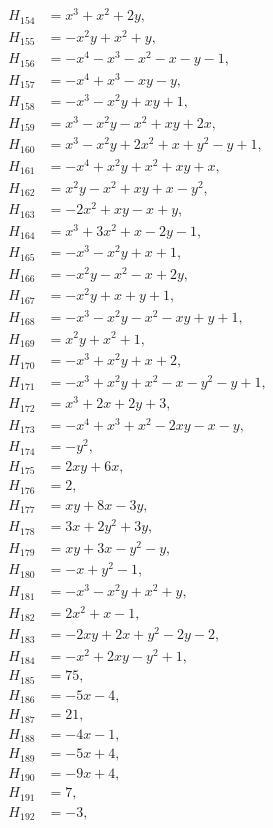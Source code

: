 \documentclass[11pt]{article}
\begin{document}
\begin{align*}
H_{154}&=x^{3}+x^{2}+2y,\\
H_{155}&=-x^{2}y+x^{2}+y,\\
H_{156}&=-x^{4}-x^{3}-x^{2}-x-y-1,\\
H_{157}&=-x^{4}+x^{3}-xy-y,\\
H_{158}&=-x^{3}-x^{2}y+xy+1,\\
H_{159}&=x^{3}-x^{2}y-x^{2}+xy+2x,\\
H_{160}&=x^{3}-x^{2}y+2x^{2}+x+y^{2}-y+1,\\
H_{161}&=-x^{4}+x^{2}y+x^{2}+xy+x,\\
H_{162}&=x^{2}y-x^{2}+xy+x-y^{2},\\
H_{163}&=-2x^{2}+xy-x+y,\\
H_{164}&=x^{3}+3x^{2}+x-2y-1,\\
H_{165}&=-x^{3}-x^{2}y+x+1,\\
H_{166}&=-x^{2}y-x^{2}-x+2y,\\
H_{167}&=-x^{2}y+x+y+1,\\
H_{168}&=-x^{3}-x^{2}y-x^{2}-xy+y+1,\\
H_{169}&=x^{2}y+x^{2}+1,\\
H_{170}&=-x^{3}+x^{2}y+x+2,\\
H_{171}&=-x^{3}+x^{2}y+x^{2}-x-y^{2}-y+1,\\
H_{172}&=x^{3}+2x+2y+3,\\
H_{173}&=-x^{4}+x^{3}+x^{2}-2xy-x-y,\\
H_{174}&=-y^{2},\\
H_{175}&=2xy+6x,\\
H_{176}&=2,\\
H_{177}&=xy+8x-3y,\\
H_{178}&=3x+2y^{2}+3y,\\
H_{179}&=xy+3x-y^{2}-y,\\
H_{180}&=-x+y^{2}-1,\\
H_{181}&=-x^{3}-x^{2}y+x^{2}+y,\\
H_{182}&=2x^{2}+x-1,\\
H_{183}&=-2xy+2x+y^{2}-2y-2,\\
H_{184}&=-x^{2}+2xy-y^{2}+1,\\
H_{185}&=75,\\
H_{186}&=-5x-4,\\
H_{187}&=21,\\
H_{188}&=-4x-1,\\
H_{189}&=-5x+4,\\
H_{190}&=-9x+4,\\
H_{191}&=7,\\
H_{192}&=-3,\\

\end{align*}
\end{document}
